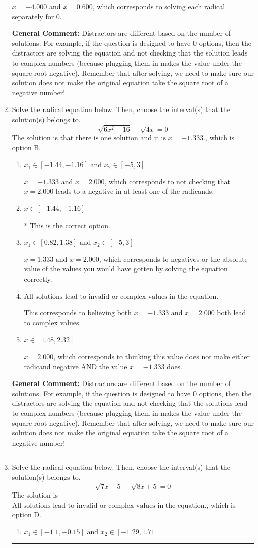 \documentclass{extbook}[14pt]
\newcommand{\litem}[1]{\item #1

\rule{\textwidth}{0.4pt}}
\begin{document}
\begin{enumerate}
{\begin{enumerate}[label=\Alph*.]
$x = -4.000$ and $x = 0.600$, which corresponds to solving each radical separately for 0.
\end{enumerate}

\textbf{General Comment:} Distractors are different based on the number of solutions. For example, if the question is designed to have 0 options, then the distractors are solving the equation and not checking that the solution leads to complex numbers (because plugging them in makes the value under the square root negative). Remember that after solving, we need to make sure our solution does not make the original equation take the square root of a negative number!
}
\litem{
Solve the radical equation below. Then, choose the interval(s) that the solution(s) belongs to.
\[ \sqrt{6 x^2 - 16} - \sqrt{4 x} = 0 \]The solution is \( \text{that there is one solution and it is } x = -1.333. \), which is option B.\begin{enumerate}[label=\Alph*.]
\item \( x_1 \in [-1.44, -1.16] \text{ and } x_2 \in [-5,3] \)

$x = -1.333 \text{ and } x = 2.000$, which corresponds to not checking that $x = 2.000$ leads to a negative in at least one of the radicands.
\item \( x \in [-1.44,-1.16] \)

* This is the correct option.
\item \( x_1 \in [0.82, 1.38] \text{ and } x_2 \in [-5,3] \)

$x = 1.333 \text{ and } x = 2.000$, which corresponds to negatives or the absolute value of the values you would have gotten by solving the equation correctly.
\item \( \text{All solutions lead to invalid or complex values in the equation.} \)

This corresponds to believing both $x = -1.333 \text{ and } x = 2.000$ both lead to complex values.
\item \( x \in [1.48,2.32] \)

$x = 2.000$, which corresponds to thinking this value does not make either radicand negative AND the value $x = -1.333$ does.
\end{enumerate}

\textbf{General Comment:} Distractors are different based on the number of solutions. For example, if the question is designed to have 0 options, then the distractors are solving the equation and not checking that the solutions lead to complex numbers (because plugging them in makes the value under the square root negative). Remember that after solving, we need to make sure our solution does not make the original equation take the square root of a negative number!
}
\litem{
Solve the radical equation below. Then, choose the interval(s) that the solution(s) belongs to.
\[ \sqrt{7 x - 5} - \sqrt{8 x + 5} = 0 \]The solution is \( \text{All solutions lead to invalid or complex values in the equation.} \), which is option D.\begin{enumerate}[label=\Alph*.]
\item \( x_1 \in [-1.1, -0.15] \text{ and } x_2 \in [-1.29,1.71] \)


\end{enumerate}}
\end{enumerate}
\end{document}
